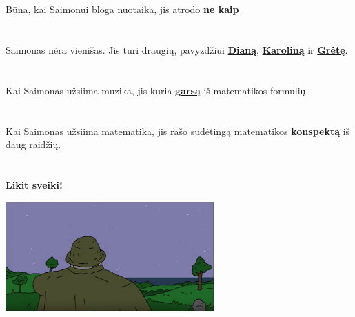 \documentclass[a4paper]{article}
\begin{document}
\section{}

Būna, kai Saimonui bloga nuotaika, jis atrodo \href{https://www.facebook.com/photo.php?fbid=1791779717765839&set=a.1720498398227305.1073741828.100008014839713&type=3&theater}{\textbf{ne kaip}}

\section{}

Saimonas nėra vienišas. Jis turi draugių, pavyzdžiui \href{http://pastebin.com/ASmJ06mu}{\textbf{Dianą}}, \href{http://pastebin.com/yqhNy1UR}{\textbf{Karoliną}} ir \href{http://pastebin.com/xKmSuHfM}{\textbf{Grėtę}}.

\section{}

Kai Saimonas užsiima muzika, jis kuria \href{https://soundcloud.com/naktinis-saimonas/simon-production}{\textbf{garsą}} iš matematikos formulių.

\section{}

Kai Saimonas užsiima matematika, jis rašo sudėtingą matematikos \href{run:diskr.pdf}{\textbf{konspektą}} iš daug raidžių.

\section{}

\href{http://www.youtube.com/watch?v=7WwLT32_VAk&t=23m30s}{\textbf{Likit sveiki!}}

\begin{center}
\includegraphics[width=80mm]{fairy.png}
\end{center}
\end{document}
